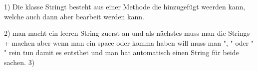 1) 
    Die klasse Stringt besteht aus einer Methode die hinzugefügt weerden kann, welche auch dann aber bearbeit werden kann.

2) 
    man macht ein leeren String zuerst an und als nächstes muss man die Strings + machen aber wenn man ein space oder komma haben will muss man ", " oder " " 
    rein tun damit es entsthet und man hat automatisch einen String für beide sachen.
3)
    